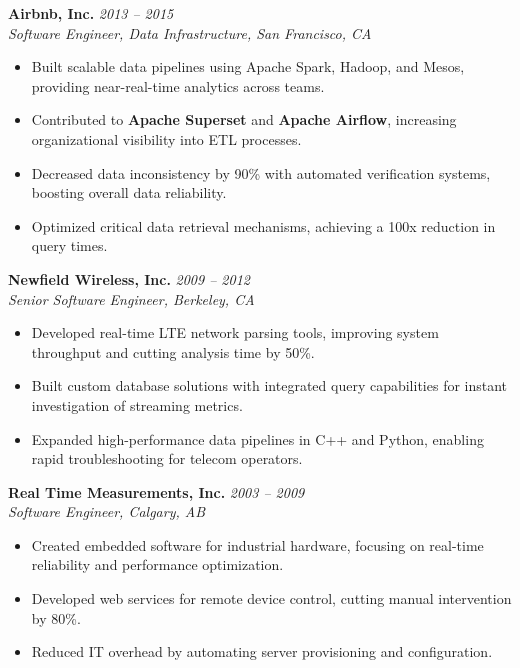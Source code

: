 \documentclass[margin,line]{resume}
\begin{document}
\begin{resume}
\textbf{Airbnb, Inc.} \hfill \textit{2013 -- 2015}\\
\textit{Software Engineer, Data Infrastructure, San Francisco, CA}
\begin{itemize}[leftmargin=0.5cm]
    \item Built scalable data pipelines using Apache Spark, Hadoop, and Mesos, providing near-real-time analytics across teams.
    \item Contributed to \textbf{Apache Superset} and \textbf{Apache Airflow}, increasing organizational visibility into ETL processes.
    \item Decreased data inconsistency by 90\% with automated verification systems, boosting overall data reliability.
    \item Optimized critical data retrieval mechanisms, achieving a 100x reduction in query times.
\end{itemize}

\textbf{Newfield Wireless, Inc.} \hfill \textit{2009 -- 2012}\\
\textit{Senior Software Engineer, Berkeley, CA}
\begin{itemize}[leftmargin=0.5cm]
    \item Developed real-time LTE network parsing tools, improving system throughput and cutting analysis time by 50\%.
    \item Built custom database solutions with integrated query capabilities for instant investigation of streaming metrics.
    \item Expanded high-performance data pipelines in C++ and Python, enabling rapid troubleshooting for telecom operators.
\end{itemize}

\textbf{Real Time Measurements, Inc.} \hfill \textit{2003 -- 2009}\\
\textit{Software Engineer, Calgary, AB}
\begin{itemize}[leftmargin=0.5cm]
    \item Created embedded software for industrial hardware, focusing on real-time reliability and performance optimization.
    \item Developed web services for remote device control, cutting manual intervention by 80\%.
    \item Reduced IT overhead by automating server provisioning and configuration.
\end{itemize}

\vspace{10pt}


\end{resume}
\end{document}
